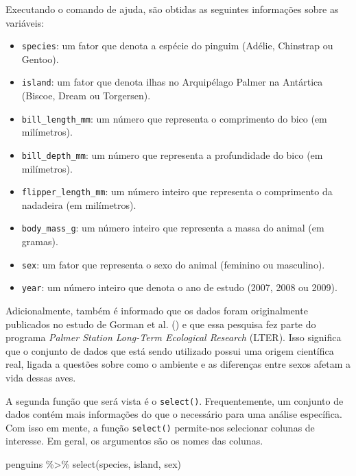 \documentclass[
  12pt,
  letterpaper,
  DIV=11,
  numbers=noendperiod]{scrreprt}
\newenvironment{Shaded}{\begin{snugshade}}{\end{snugshade}}
\newcommand{\FunctionTok}[1]{\textcolor[rgb]{0.28,0.35,0.67}{#1}}
\newcommand{\NormalTok}[1]{\textcolor[rgb]{0.00,0.23,0.31}{#1}}
\newcommand{\SpecialCharTok}[1]{\textcolor[rgb]{0.37,0.37,0.37}{#1}}
\providecommand{\tightlist}{%
  \setlength{\itemsep}{0pt}\setlength{\parskip}{0pt}}\usepackage{longtable,booktabs,array}
\begin{document}
Executando o comando de ajuda, são obtidas as seguintes informações
sobre as variáveis:

\begin{itemize}
\tightlist
\item
  \texttt{species}: um fator que denota a espécie do pinguim (Adélie,
  Chinstrap ou Gentoo).
\item
  \texttt{island}: um fator que denota ilhas no Arquipélago Palmer na
  Antártica (Biscoe, Dream ou Torgersen).
\item
  \texttt{bill\_length\_mm}: um número que representa o comprimento do
  bico (em milímetros).
\item
  \texttt{bill\_depth\_mm}: um número que representa a profundidade do
  bico (em milímetros).
\item
  \texttt{flipper\_length\_mm}: um número inteiro que representa o
  comprimento da nadadeira (em milímetros).
\item
  \texttt{body\_mass\_g}: um número inteiro que representa a massa do
  animal (em gramas).
\item
  \texttt{sex}: um fator que representa o sexo do animal (feminino ou
  masculino).
\item
  \texttt{year}: um número inteiro que denota o ano de estudo (2007,
  2008 ou 2009).
\end{itemize}

Adicionalmente, também é informado que os dados foram originalmente
publicados no estudo de Gorman et al.
() e que essa
pesquisa fez parte do programa \emph{Palmer Station Long-Term Ecological
Research} (LTER). Isso significa que o conjunto de dados que está sendo
utilizado possui uma origem científica real, ligada a questões sobre
como o ambiente e as diferenças entre sexos afetam a vida dessas aves.

A segunda função que será vista é o \texttt{select()}. Frequentemente,
um conjunto de dados contém mais informações do que o necessário para
uma análise específica. Com isso em mente, a função \texttt{select()}
permite-nos selecionar colunas de interesse. Em geral, os argumentos são
os nomes das colunas.

\begin{Shaded}
\begin{Highlighting}[]
\NormalTok{penguins }\SpecialCharTok{\%\textgreater{}\%} 
  \FunctionTok{select}\NormalTok{(species, island, sex)}
\end{Highlighting}
\end{Shaded}
\end{document}
